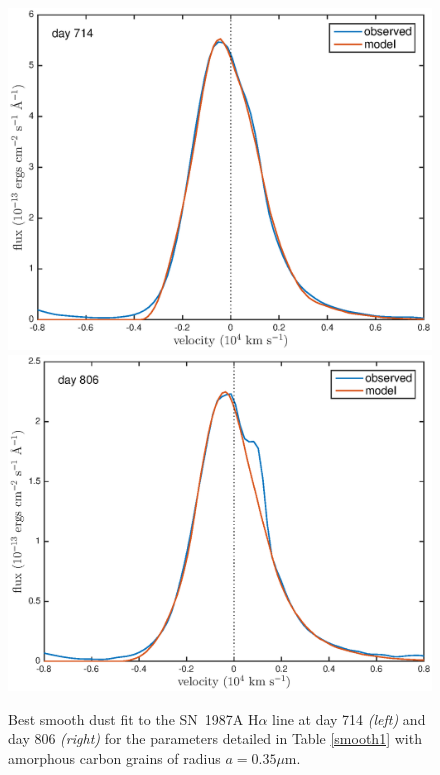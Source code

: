 \documentclass[useAMS,usenatbib,usegraphicx]{mnras}
\begin{document}
\begin{figure}
\begin{center}
\includegraphics[trim =33 10 45 15,clip=true,scale=0.41]{smooth/best_fit/d714Ha}
\includegraphics[trim =33 10 45 15,clip=true,scale=0.41]{smooth/best_fit/d806Ha_new}
\caption{Best smooth dust fit to the SN~1987A H$\alpha$ line at day 714 \textit{\textit{(left)}} and day 806 \textit{\textit{(right)}} for the parameters detailed in Table \ref{smooth1} with amorphous carbon grains of radius $a=0.35 \mu$m.}
\label{Ha_smooth}
\end{center}
\end{figure}
\end{document}
